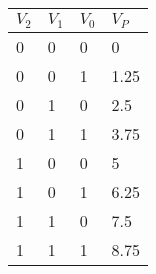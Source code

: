 \setlength{\arrayrulewidth}{0.3mm}
\setlength{\tabcolsep}{15pt}
\renewcommand{\arraystretch}{1.5}



\begin{tabular}{ |p{2cm}|p{2cm}|p{2cm}|p{2cm}| }
\hline
$V_2$ & $V_1$ & $V_0$ & $V_P$\\
\hline
0 & 0 & 0 & 0\\
\hline
0 & 0 & 1 & 1.25 \\
\hline
0 & 1 & 0 & 2.5 \\
\hline
0 & 1 & 1 & 3.75 \\
\hline
1 & 0 & 0 & 5 \\
\hline
1 & 0 & 1 & 6.25 \\
\hline
1 & 1 & 0 & 7.5 \\
\hline
1 & 1 & 1 & 8.75 \\
\hline
\end{tabular}

